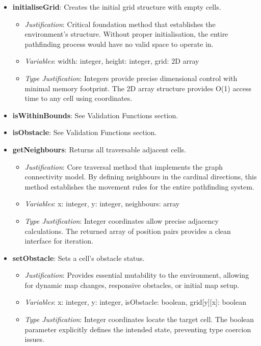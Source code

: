 \begin{itemize}
  \item \textbf{initialiseGrid}: Creates the initial grid structure with empty cells.
    \begin{itemize}
      \item \textit{Justification}: Critical foundation method that establishes the environment's structure. Without proper initialisation, the entire pathfinding process would have no valid space to operate in.
      \item \textit{Variables}: width: integer, height: integer, grid: 2D array
      \item \textit{Type Justification}: Integers provide precise dimensional control with minimal memory footprint. The 2D array structure provides O(1) access time to any cell using coordinates.
    \end{itemize}
    
  \item \textbf{isWithinBounds}: See Validation Functions section.
  
  \item \textbf{isObstacle}: See Validation Functions section.
  
  \item \textbf{getNeighbours}: Returns all traversable adjacent cells.
    \begin{itemize}
      \item \textit{Justification}: Core traversal method that implements the graph connectivity model. By defining neighbours in the cardinal directions, this method establishes the movement rules for the entire pathfinding system.
      \item \textit{Variables}: x: integer, y: integer, neighbours: array
      \item \textit{Type Justification}: Integer coordinates allow precise adjacency calculations. The returned array of position pairs provides a clean interface for iteration.
    \end{itemize}
  
  \item \textbf{setObstacle}: Sets a cell's obstacle status.
    \begin{itemize}
      \item \textit{Justification}: Provides essential mutability to the environment, allowing for dynamic map changes, responsive obstacles, or initial map setup.
      \item \textit{Variables}: x: integer, y: integer, isObstacle: boolean, grid[y][x]: boolean
      \item \textit{Type Justification}: Integer coordinates locate the target cell. The boolean parameter explicitly defines the intended state, preventing type coercion issues.
    \end{itemize}
\end{itemize}

